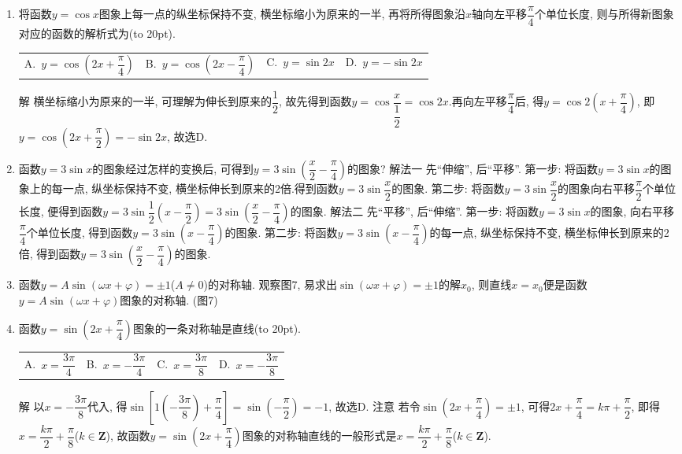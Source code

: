 \documentclass[10pt,a4paper]{article}
\newcommand{\blank}[1]{\underline{\hbox to #1pt{}}}
\newcommand{\bracket}[1]{(\hbox to #1pt{})}
\newcommand{\fourch}[4]{\par\begin{tabular}{p{.23\textwidth}p{.23\textwidth}p{.23\textwidth}p{.23\textwidth}}
A.~#1 &B.~#2& C.~#3& D.~#4
\end{tabular}}
\begin{document}
\begin{enumerate}[1.]
解  令$f(x)=3\cos 2x$, 则
$\begin{cases} f(x-m)=3\cos 2(x-m)=3\cos (2x-2m)=3\cos (2m-2x)=3\sin [\dfrac{\pi }2-(2m-2x)] \\ =3\sin (2x+\dfrac{\pi }2-2m).
\end{cases}$按题意应有$3\sin (2x+\dfrac{\pi }2-2m)=3\sin (2x+\dfrac{\pi }4)$.
令$\dfrac{\pi }2-2m=\dfrac{\pi }4$, 得$m=\dfrac{\pi }8$, 故选D.
也可以这样解:
$\because f(x)=3\sin (2x+\dfrac{\pi }4)=3\cos [(2x+\dfrac{\pi }4)-\dfrac{\pi }2]$
\blank{50}$=3\cos (2x-\dfrac{\pi }4)=3\cos [2(x-\dfrac{\pi }8)]=f(x-\dfrac{\pi }8)$,
$\therefore$选D.
(2)坐标的``伸缩''.
容易证明, 函数$y=f(\dfrac xk)$($k>0$)的图象, 可由将$y=f(x)$图象上每—点的横坐标伸长到原来的$k$倍(纵坐标不变)而得到.
\item 将函数$y=\cos x$图象上每一点的纵坐标保持不变, 横坐标缩小为原来的一半, 再将所得图象沿$x$轴向左平移$\dfrac{\pi }4$个单位长度, 则与所得新图象对应的函数的解析式为\bracket{20}.
\fourch{$y=\cos (2x+\dfrac{\pi }4)$}{$y=\cos (2x-\dfrac{\pi }4)$}{$y=\sin 2x$}{$y=-\sin 2x$}
解  横坐标缩小为原来的一半, 可理解为伸长到原来的$\dfrac 12$, 故先得到函数$y=\cos \dfrac x{\dfrac 12}=\cos 2x$.再向左平移$\dfrac{\pi }4$后, 得$y=\cos 2(x+\dfrac{\pi }4)$, 即$y=\cos (2x+\dfrac{\pi }2)=-\sin 2x$, 故选D.
\item 函数$y=3\sin x$的图象经过怎样的变换后, 可得到$y=3\sin (\dfrac x2-\dfrac{\pi }4)$的图象?
解法一  先``伸缩'', 后``平移''.
第一步: 将函数$y=3\sin x$的图象上的每一点, 纵坐标保持不变, 横坐标伸长到原来的2倍.得到函数$y=3\sin \dfrac x2$的图象.
第二步: 将函数$y=3\sin \dfrac x2$的图象向右平移$\dfrac{\pi }2$个单位长度, 便得到函数$y=3\sin \dfrac 12(x-\dfrac{\pi }2)=3\sin (\dfrac x2-\dfrac{\pi }4)$的图象.
解法二  先``平移'', 后``伸缩''.
第一步: 将函数$y=3\sin x$的图象, 向右平移$\dfrac{\pi }4$个单位长度, 得到函数$y=3\sin (x-\dfrac{\pi }4)$的图象.
第二步: 将函数$y=3\sin (x-\dfrac{\pi }4)$的每一点, 纵坐标保持不变, 横坐标伸长到原来的2倍, 得到函数$y=3\sin (\dfrac x2-\dfrac{\pi }4)$的图象.
\item 函数$y=A\sin (\omega x+\varphi)=\pm 1$($A\ne 0$)的对称轴.
观察图7, 易求出$\sin (\omega x+\varphi)=\pm 1$的解$x_0$, 则直线$x=x_0$便是函数$y=A\sin (\omega x+\varphi)$图象的对称轴.
(图7)
\item 函数$y=\sin (2x+\dfrac{\pi }4)$图象的一条对称轴是直线\bracket{20}.
\fourch{$x=\dfrac{3\pi }4$}{$x=-\dfrac{3\pi }4$}{$x=\dfrac{3\pi }8$}{$x=-\dfrac{3\pi }8$}
解  以$x=-\dfrac{3\pi }8$代入, 得$\sin [1(-\dfrac{3\pi }8)+\dfrac{\pi }4]=\sin (-\dfrac{\pi }2)=-1$, 故选D.
注意  若令$\sin (2x+\dfrac{\pi }4)=\pm 1$, 可得$2x+\dfrac{\pi }4=k\pi +\dfrac{\pi }2$, 即得$x=\dfrac{k\pi }2+\dfrac{\pi }8$($k\in \mathbf{Z}$), 故函数$y=\sin (2x+\dfrac{\pi }4)$图象的对称轴直线的一般形式是$x=\dfrac{k\pi }2+\dfrac{\pi }8$($k\in \mathbf{Z}$).

\end{enumerate}
\end{document}
